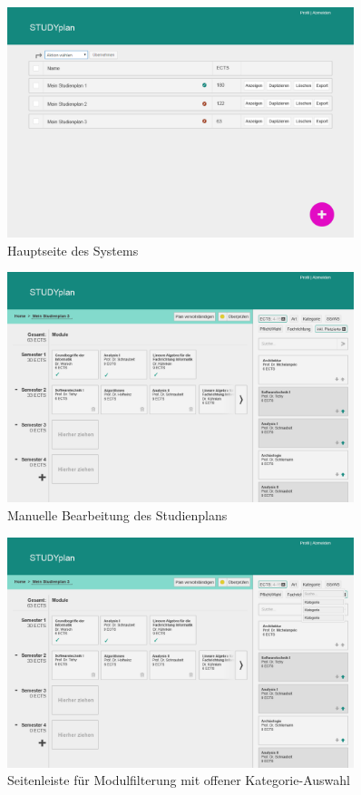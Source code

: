 \begin{figure}
	\caption{Hauptseite des Systems}
	\label{fig:gui-hauptseite-1}
	\centering
	\includegraphics[width=0.9\textwidth]{../GUI/ergebnisse/hauptseite-1.png}
\end{figure}
\begin{figure}
	\caption{Manuelle Bearbeitung des Studienplans}
	\label{fig:gui-bearbeitung-1}
	\centering
	\includegraphics[width=0.9\textwidth]{../GUI/ergebnisse/bearbeitung-1.png}
\end{figure}
\begin{figure}
	\caption{Seitenleiste für Modulfilterung mit offener Kategorie-Auswahl}
	\label{fig:gui-module-filtern-1}
	\centering
	\includegraphics[width=0.9\textwidth]{../GUI/ergebnisse/module-filtern-1.png}
\end{figure}
